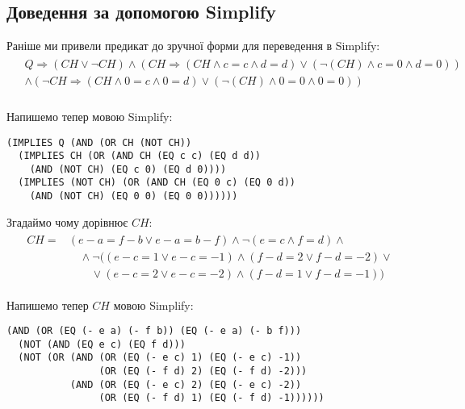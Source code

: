 \documentclass[14pt,a4paper]{extarticle}
\theoremstyle{definition}
\begin{document}
\subsection{Доведення за допомогою Simplify}
Раніше ми привели предикат до зручної форми для переведення в Simplify:
\begin{align*}
  \begin{split}
    &Q \Rightarrow (CH \lor \lnot CH)
      \land (CH \Rightarrow (CH \land c = c \land d = d)
        \lor (\lnot(CH) \land c = 0 \land d = 0))\\
      &\land (\lnot CH \Rightarrow (CH \land 0 = c \land 0 = d)
        \lor (\lnot(CH) \land 0 = 0 \land 0 = 0))\\
  \end{split}
\end{align*}

Напишемо тепер мовою Simplify:

\begin{lstlisting}[breaklines=true,basicstyle= \ttfamily]
(IMPLIES Q (AND (OR CH (NOT CH))
  (IMPLIES CH (OR (AND CH (EQ c c) (EQ d d))
    (AND (NOT CH) (EQ c 0) (EQ d 0))))
  (IMPLIES (NOT CH) (OR (AND CH (EQ 0 c) (EQ 0 d))
    (AND (NOT CH) (EQ 0 0) (EQ 0 0))))))
\end{lstlisting}

Згадаймо чому дорівнює $CH$:
\begin{align*}
  \begin{split}
    CH =& (e-a=f-b \lor e-a=b-f) \land \lnot (e = c \land f = d) \land \\
    &\quad\land\lnot ((e-c=1 \lor e-c=-1) \land (f-d=2 \lor f-d=-2) \lor \\
    &\quad\quad\lor (e-c=2 \lor e-c=-2) \land (f-d=1 \lor f-d=-1))
  \end{split}
\end{align*}

Напишемо тепер $CH$ мовою Simplify:
\begin{lstlisting}[breaklines=true,basicstyle= \ttfamily]
(AND (OR (EQ (- e a) (- f b)) (EQ (- e a) (- b f)))
  (NOT (AND (EQ e c) (EQ f d)))
  (NOT (OR (AND (OR (EQ (- e c) 1) (EQ (- e c) -1))
                (OR (EQ (- f d) 2) (EQ (- f d) -2)))
           (AND (OR (EQ (- e c) 2) (EQ (- e c) -2))
                (OR (EQ (- f d) 1) (EQ (- f d) -1))))))
\end{lstlisting}
\end{document}
